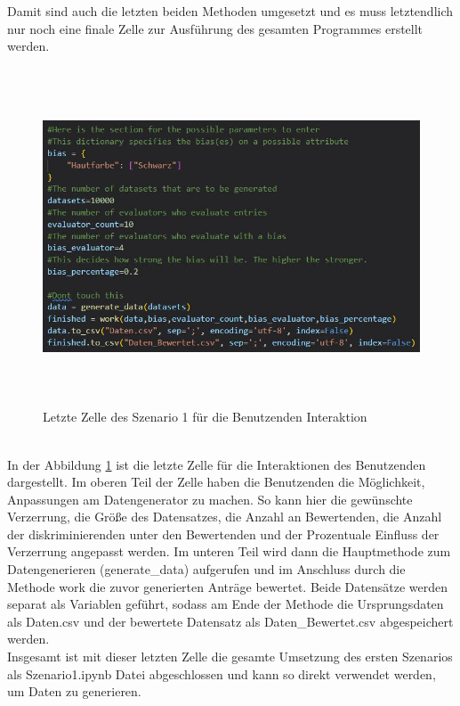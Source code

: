 \begin{onehalfspace}
Damit sind auch die letzten beiden Methoden umgesetzt und es muss letztendlich nur noch eine finale Zelle zur Ausführung des gesamten Programmes erstellt werden.\\
\begin{figure}[h]
    \centering
    \includegraphics[width=16cm,height=10cm]{Diagramme/Sz1Final.JPG}
    \caption{Letzte Zelle des Szenario 1 für die Benutzenden Interaktion}
    \label{fig:Sz1finalCell}
\end{figure}\\
In der Abbildung \ref{fig:Sz1finalCell} ist die letzte Zelle für die Interaktionen des Benutzenden dargestellt. Im oberen Teil der Zelle haben die Benutzenden die Möglichkeit, Anpassungen am Datengenerator zu machen. So kann hier die gewünschte Verzerrung, die Größe des Datensatzes, die Anzahl an Bewertenden, die Anzahl der diskriminierenden unter den Bewertenden und der Prozentuale Einfluss der Verzerrung angepasst werden. Im unteren Teil wird dann die Hauptmethode zum Datengenerieren (generate\_data) aufgerufen und im Anschluss durch die Methode \glqq{}work\grqq{} die zuvor generierten Anträge bewertet. Beide Datensätze werden separat als Variablen geführt, sodass am Ende der Methode die Ursprungsdaten als \glqq{}Daten.csv\grqq{} und der bewertete Datensatz als \glqq{}Daten\_Bewertet.csv\grqq{} abgespeichert werden.\\
Insgesamt ist mit dieser letzten Zelle die gesamte Umsetzung des ersten Szenarios als \glqq{}Szenario1.ipynb\grqq{} Datei abgeschlossen und kann so direkt verwendet werden, um Daten zu generieren.

\end{onehalfspace}
